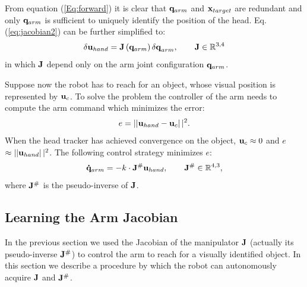 From equation (\ref{Eq:forward}) it is clear that 
$\mathbf q_{arm}$ and $\mathbf{x}_{target}$ are redundant and only $\mathbf q_{arm}$ is 
sufficient to uniquely identify the position of the head. Eq.
(\ref{eq:jacobian2}) can be further simplified to:
%
\begin{equation} 
\label{eq:jacobian3}
  \mathbf {\delta u}_{hand}=
  \mathbf J \left(\mathbf q_{arm}\right)
  \mathbf {\delta q}_{arm},\qquad \mathbf J \in \mathbb R^{3,4}
\end{equation}
%
in which $\mathbf J$ depend only on the arm 
joint configuration $\mathbf q_{arm}$.

Suppose now the robot has to reach for an object, whose visual position is 
represented by $\mathbf{u}_{c}$. To solve the problem 
the controller of the arm needs to compute the arm command which minimizes 
the error:
%
\begin{equation}
  e=\left||\mathbf{u}_{hand}-\mathbf{u}_{c}\right||^2.
\end{equation}
%
When the head tracker has achieved convergence on the object, 
$\mathbf{u}_{c} \approx 0 $ and $e$ $\approx \left||\mathbf{u}_{hand}\right||^2$.
The following control strategy minimizes $e$:
%
\begin{equation}
\mathbf{\dot q}_{arm}=-k \cdot \mathbf J^\# \mathbf{u}_{hand}, 
\qquad \mathbf J^\# \in \mathbb R^{4,3},
\end{equation}
%
where $\mathbf J^\#$ is the pseudo-inverse of $\mathbf J$.

\subsection{Learning the Arm Jacobian}
%
In the previous section we used the Jacobian of the manipulator
$\mathbf J$ (actually its pseudo-inverse $\mathbf J^\#$) to 
control the arm to reach for a visually identified object. In 
this section we describe a procedure by which the robot can 
autonomously acquire $\mathbf J$ and $\mathbf J^\#$.

